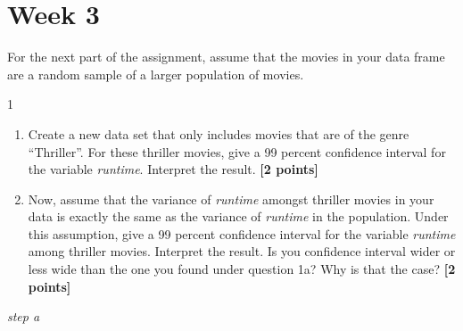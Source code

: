 \documentclass[
]{article}
\newenvironment{Shaded}{\begin{snugshade}}{\end{snugshade}}
\newcommand{\AttributeTok}[1]{\textcolor[rgb]{0.13,0.29,0.53}{#1}}
\newcommand{\DecValTok}[1]{\textcolor[rgb]{0.00,0.00,0.81}{#1}}
\newcommand{\FloatTok}[1]{\textcolor[rgb]{0.00,0.00,0.81}{#1}}
\newcommand{\FunctionTok}[1]{\textcolor[rgb]{0.13,0.29,0.53}{\textbf{#1}}}
\newcommand{\NormalTok}[1]{#1}
\newcommand{\OtherTok}[1]{\textcolor[rgb]{0.56,0.35,0.01}{#1}}
\newcommand{\SpecialCharTok}[1]{\textcolor[rgb]{0.81,0.36,0.00}{\textbf{#1}}}
\newcommand{\StringTok}[1]{\textcolor[rgb]{0.31,0.60,0.02}{#1}}
\providecommand{\tightlist}{%
  \setlength{\itemsep}{0pt}\setlength{\parskip}{0pt}}
\begin{document}
\section{Week 3}\label{week-3}

For the next part of the assignment, assume that the movies in your data
frame are a random sample of a larger population of movies.

1

\begin{enumerate}
\def\labelenumi{\alph{enumi}.}
\tightlist
\item
  Create a new data set that only includes movies that are of the genre
  ``Thriller''. For these thriller movies, give a 99 percent confidence
  interval for the variable \emph{runtime}. Interpret the result.
  \textbf{[2 points]}
\item
  Now, assume that the variance of \emph{runtime} amongst thriller
  movies in your data is exactly the same as the variance of
  \emph{runtime} in the population. Under this assumption, give a 99
  percent confidence interval for the variable \emph{runtime} among
  thriller movies. Interpret the result. Is you confidence interval
  wider or less wide than the one you found under question 1a? Why is
  that the case? \textbf{[2 points]}
\end{enumerate}

\emph{step a}

\begin{Shaded}
\end{Shaded}
\end{document}
